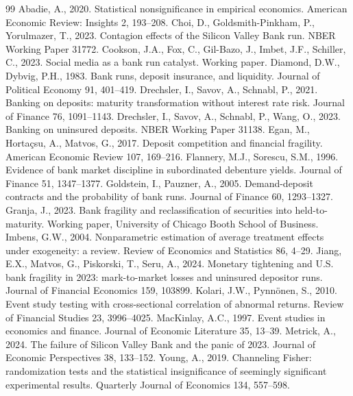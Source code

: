 \documentclass[12pt]{article}
\begin{document}
\begin{thebibliography}{99}
 Abadie, A., 2020. Statistical nonsignificance in empirical
economics. American Economic Review: Insights 2, 193--208.
 Choi, D., Goldsmith-Pinkham, P., Yorulmazer, T., 2023.
Contagion effects of the Silicon Valley Bank run. NBER Working Paper 31772.
 Cookson, J.A., Fox, C., Gil-Bazo, J., Imbet, J.F.,
Schiller, C., 2023. Social media as a bank run catalyst. Working paper.
 Diamond, D.W., Dybvig, P.H., 1983.
Bank runs, deposit insurance, and liquidity. Journal of Political Economy 91, 401--419.
 Drechsler, I., Savov, A., Schnabl, P., 2021.
Banking on deposits: maturity transformation without interest rate risk. Journal of Finance 76, 1091--1143.
 Drechsler, I., Savov, A., Schnabl, P., Wang, O., 2023.
Banking on uninsured deposits. NBER Working Paper 31138.
 Egan, M., Horta\c{c}su, A., Matvos, G., 2017.
Deposit competition and financial fragility. American Economic Review 107, 169--216.
 Flannery, M.J., Sorescu, S.M., 1996.
Evidence of bank market discipline in subordinated debenture yields. Journal of Finance 51, 1347--1377.
 Goldstein, I., Pauzner, A., 2005.
Demand-deposit contracts and the probability of bank runs. Journal of Finance 60, 1293--1327.
 Granja, J., 2023. Bank fragility and reclassification of
securities into held-to-maturity. Working paper, University of Chicago Booth School of Business.
 Imbens, G.W., 2004. Nonparametric estimation of average
treatment effects under exogeneity: a review. Review of Economics and Statistics 86, 4--29.
 Jiang, E.X., Matvos, G., Piskorski, T., Seru, A., 2024.
Monetary tightening and U.S. bank fragility in 2023: mark-to-market losses and uninsured depositor runs.
Journal of Financial Economics 159, 103899.
 Kolari, J.W., Pynn\"onen, S., 2010. Event
study testing with cross-sectional correlation of abnormal returns. Review of Financial Studies 23, 3996--4025.
 MacKinlay, A.C., 1997. Event studies in economics and
finance. Journal of Economic Literature 35, 13--39.
 Metrick, A., 2024. The failure of Silicon Valley Bank and
the panic of 2023. Journal of Economic Perspectives 38, 133--152.
 Young, A., 2019. Channeling Fisher: randomization tests and the
statistical insignificance of seemingly significant experimental results. Quarterly Journal of
Economics 134, 557--598.
\end{thebibliography}
\end{document}
